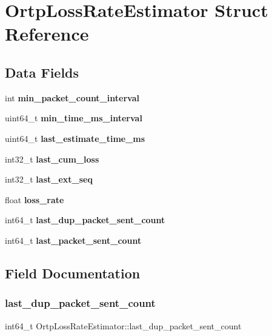 \section{Ortp\+Loss\+Rate\+Estimator Struct Reference}
\label{structOrtpLossRateEstimator}
\subsection*{Data Fields}
\begin{DoxyCompactItemize}
\item 
\mbox{\label{structOrtpLossRateEstimator_a2db3186332280ffc7f3d088d1a7c71e1}} 
int {\bfseries min\+\_\+packet\+\_\+count\+\_\+interval}
\item 
\mbox{\label{structOrtpLossRateEstimator_aa1d123ae1039233d5cc624c50c769977}} 
uint64\+\_\+t {\bfseries min\+\_\+time\+\_\+ms\+\_\+interval}
\item 
\mbox{\label{structOrtpLossRateEstimator_ac90b5ad8c14f25d80c14244b39f140d9}} 
uint64\+\_\+t {\bfseries last\+\_\+estimate\+\_\+time\+\_\+ms}
\item 
\mbox{\label{structOrtpLossRateEstimator_a73aafffcca5e6b9c2f094006de548442}} 
int32\+\_\+t {\bfseries last\+\_\+cum\+\_\+loss}
\item 
\mbox{\label{structOrtpLossRateEstimator_a0f8dbdb3a5e4a26fcf29886c918ef964}} 
int32\+\_\+t {\bfseries last\+\_\+ext\+\_\+seq}
\item 
\mbox{\label{structOrtpLossRateEstimator_aaac9677e8d63b25186eece3695f30380}} 
float {\bfseries loss\+\_\+rate}
\item 
int64\+\_\+t \textbf{ last\+\_\+dup\+\_\+packet\+\_\+sent\+\_\+count}
\item 
int64\+\_\+t \textbf{ last\+\_\+packet\+\_\+sent\+\_\+count}
\end{DoxyCompactItemize}


\subsection{Field Documentation}
\mbox{\label{structOrtpLossRateEstimator_a282565858881ab8d97e3870e218ed2d0}} 
\subsubsection{last\+\_\+dup\+\_\+packet\+\_\+sent\+\_\+count}
{\footnotesize\ttfamily int64\+\_\+t Ortp\+Loss\+Rate\+Estimator\+::last\+\_\+dup\+\_\+packet\+\_\+sent\+\_\+count}


